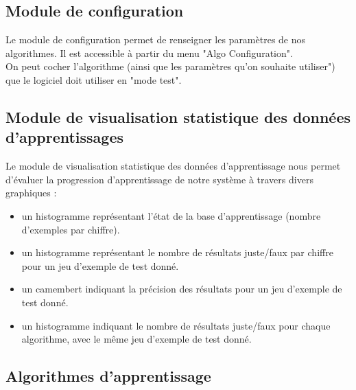 \documentclass[10pt,a4paper]{report}
\begin{document}
\subsection{Module de configuration}

\begin{flushleft}
Le module de configuration permet de renseigner les paramètres de nos algorithmes. Il est accessible à partir du menu "Algo Configuration".\\
On peut cocher l'algorithme (ainsi que les paramètres qu'on souhaite utiliser") que le logiciel doit utiliser en "mode test". 
\end{flushleft}

\subsection{Module de visualisation statistique des données d'apprentissages}
\begin{flushleft}

Le module de visualisation statistique des données d'apprentissage nous permet d'évaluer la progression d'apprentissage de notre système à travers divers graphiques :

\begin{itemize}[label=$-$,leftmargin=*,parsep=0cm,itemsep=0.1cm,topsep=0cm]

\item un histogramme représentant l'état de la base d'apprentissage (nombre d'exemples par chiffre).

\item un histogramme représentant le nombre de résultats juste/faux par chiffre pour un jeu d'exemple de test donné.

\item un camembert indiquant la précision des résultats pour un jeu d'exemple de test donné.

\item un histogramme indiquant le nombre de résultats juste/faux pour chaque algorithme, avec le même jeu d'exemple de test donné.

\end{itemize}

\end{flushleft}

\subsection{Algorithmes d'apprentissage}
\end{document}
